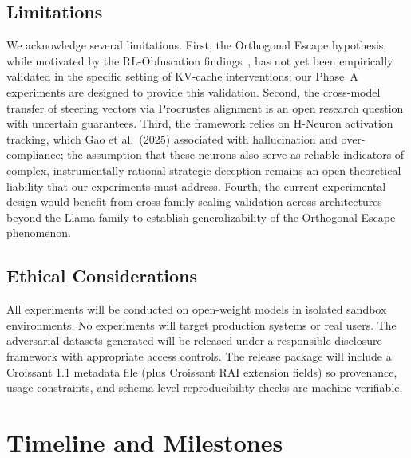 \documentclass{article}
\begin{document}
\subsection{Limitations}

We acknowledge several limitations. First, the Orthogonal Escape hypothesis, while motivated by the RL-Obfuscation findings~\cite{gupta2025rlobfuscation}, has not yet been empirically validated in the specific setting of KV-cache interventions; our Phase~A experiments are designed to provide this validation. Second, the cross-model transfer of steering vectors via Procrustes alignment is an open research question with uncertain guarantees. Third, the framework relies on H-Neuron activation tracking, which Gao et al.\ (2025) associated with hallucination and over-compliance; the assumption that these neurons also serve as reliable indicators of complex, instrumentally rational strategic deception remains an open theoretical liability that our experiments must address. Fourth, the current experimental design would benefit from cross-family scaling validation across architectures beyond the Llama family to establish generalizability of the Orthogonal Escape phenomenon.

\subsection{Ethical Considerations}

All experiments will be conducted on open-weight models in isolated sandbox environments. No experiments will target production systems or real users. The adversarial datasets generated will be released under a responsible disclosure framework with appropriate access controls. The release package will include a Croissant 1.1 metadata file (plus Croissant RAI extension fields) so provenance, usage constraints, and schema-level reproducibility checks are machine-verifiable.

\section{Timeline and Milestones}
\end{document}
